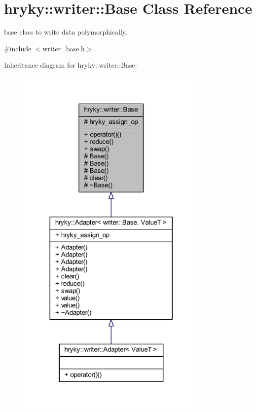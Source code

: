\hypertarget{classhryky_1_1writer_1_1_base}{\section{hryky\-:\-:writer\-:\-:Base Class Reference}
\label{classhryky_1_1writer_1_1_base}
}


base class to write data polymorphically.  




{\ttfamily \#include $<$writer\-\_\-base.\-h$>$}



Inheritance diagram for hryky\-:\-:writer\-:\-:Base\-:
\nopagebreak
\begin{figure}[H]
\begin{center}
\leavevmode
\includegraphics[width=266pt]{classhryky_1_1writer_1_1_base__inherit__graph}
\end{center}
\end{figure}
